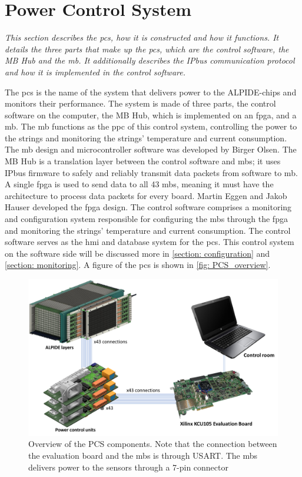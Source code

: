 \documentclass[main.tex]{subfiles}
\begin{document}
\section{Power Control System}
\label{section: pcs}
\textit{This section describes the \acrlong{pcs}, how it is constructed and how it functions. It details the three parts that make up the \gls{pcs}, which are the control software, the MB Hub and the \gls{mb}. It additionally describes the IPbus communication protocol and how it is implemented in the control software.}

The \gls{pcs} is the name of the system that delivers power to the ALPIDE-chips and monitors their performance. The system is made of three parts, the control software on the computer, the MB Hub, which is implemented on an \gls{fpga}, and a \acrlong{mb}. The \gls{mb} functions as the \gls{ppc} of this control system, controlling the power to the strings and monitoring the strings' temperature and current consumption. The \gls{mb} design and microcontroller software was developed by Birger Olsen. The MB Hub is a translation layer between the control software and \gls{mb}s; it uses IPbus firmware to safely and reliably transmit data packets from software to \gls{mb}. A single \gls{fpga} is used to send data to all 43 \gls{mb}s, meaning it must have the architecture to process data packets for every board. Martin Eggen and Jakob Hauser developed the \gls{fpga} design. The control software comprises a monitoring and configuration system responsible for configuring the \gls{mb}s through the \gls{fpga} and monitoring the strings' temperature and current consumption. The control software serves as the \gls{hmi} and database system for the \gls{pcs}. This control system on the software side will be discussed more in \autoref{section: configuration} and \autoref{section: monitoring}. A figure of the \gls{pcs} is shown in \autoref{fig: PCS_overview}.

\begin{figure}[!htpb]
    \centering
    \includegraphics[width=15cm]{images/PowerDeliverySystemOverview.png}
    \caption{Overview of the PCS components. Note that the connection between the evaluation board and the \gls{mb}s is through USART. The \gls{mb}s delivers power to the sensors through a 7-pin connector\cite{gutta}}
    \label{fig: PCS_overview}
\end{figure}
\FloatBarrier
\end{document}
